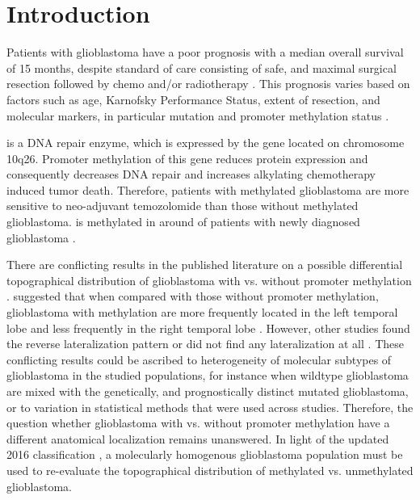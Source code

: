 \section{Introduction}

Patients with glioblastoma have a poor prognosis with a median overall survival of 15 months, despite standard of care consisting of safe, and maximal surgical resection followed by chemo and/or radiotherapy \autocite{stupp2005radiotherapy}.
This prognosis varies based on factors such as age, Karnofsky Performance Status, extent of resection, and molecular markers, in particular  mutation and  promoter methylation status \autocite{gessler2018surgery}.

 is a DNA repair enzyme, which is expressed by the  gene located on chromosome 10q26.
Promoter methylation of this gene reduces  protein expression and consequently decreases DNA repair and increases alkylating chemotherapy induced \gls{tumor} death.
Therefore, patients with  methylated glioblastoma are more sensitive to neo-adjuvant temozolomide than those without  methylated glioblastoma.
 is methylated in around  of patients with newly diagnosed glioblastoma \autocite{hegi2005MGMT}.

There are conflicting results in the published literature on a possible differential topographical distribution of glioblastoma with vs. without  promoter methylation \autocite{smits2017imaging}.
 suggested that when compared with those without  promoter methylation, glioblastoma with methylation are more frequently located in the left temporal lobe and less frequently in the right temporal lobe \autocite{ellingson2012anatomic}.
However, other studies found the reverse lateralization pattern \autocite{wang2014anatomical} or did not find any lateralization at all \autocite{carillo2012relationship, eoli2007methylation, han2018structural}.
These conflicting results could be ascribed to heterogeneity of molecular subtypes of glioblastoma in the studied populations, for instance when  wildtype glioblastoma are mixed with the genetically, and prognostically distinct  mutated glioblastoma, or to variation in statistical methods that were used across studies.
Therefore, the question whether glioblastoma with vs. without  promoter methylation have a different anatomical localization remains unanswered.
In light of the updated  2016 classification \autocite{louis20162016}, a molecularly homogenous glioblastoma population must be used to re-evaluate the topographical distribution of  methylated vs. unmethylated glioblastoma.

